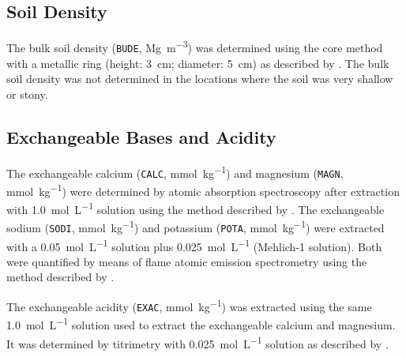 

\subsection{Soil Density}
\label{chap:chap04-bude}

The bulk soil density (\texttt{BUDE}, \si{\mega\gram\per\cubic\metre}) was determined using the core method 
with a metallic ring (height: \SI{3}{\centi\metre}; diameter: \SI{5}{\centi\metre}) as described by 
. The bulk soil density was not determined in the locations where the soil was 
very shallow or stony.

\subsection{Exchangeable Bases and Acidity}
\label{chap:chap04-ecec}

The exchangeable calcium (\texttt{CALC}, \si{\milli\mole\per\kilo\gram}) and magnesium (\texttt{MAGN}, 
\si{\milli\mole\per\kilo\gram}) were determined by atomic absorption spectroscopy after extraction with 
\SI{1.0}{\mole\per\liter}  solution using the method described by . 
The exchangeable sodium (\texttt{SODI}, \si{\milli\mole\per\kilo\gram}) and potassium (\texttt{POTA}, 
\si{\milli\mole\per\kilo\gram}) were extracted with a \SI{0.05}{\mole\per\liter}  solution plus 
\SI{0.025}{\mole\per\liter}  (Mehlich-\num{1} solution). Both were quantified by means of flame 
atomic emission spectrometry using the method described by .

The exchangeable acidity (\texttt{EXAC}, \si{\milli\mole\per\kilo\gram}) was extracted using the same 
\SI{1.0}{\mole\per\liter}  solution used to extract the exchangeable calcium and magnesium. It was 
determined by titrimetry with \SI{0.025}{\mole\per\liter}  solution as described by 
.

